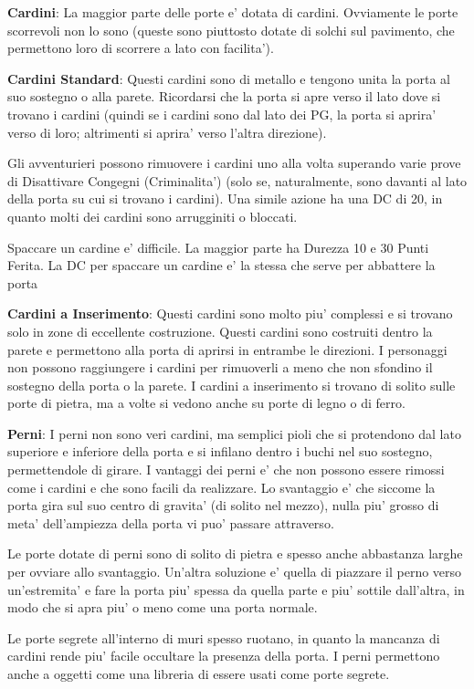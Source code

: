 \documentclass[a4paper,11pt,twoside,openany]{dndbook}
\begin{document}
{\textbf{Cardini}: La maggior parte delle porte e' dotata di cardini. Ovviamente le porte scorrevoli non lo sono (queste sono piuttosto dotate di solchi sul pavimento, che permettono loro di scorrere a lato con facilita').

\textbf{Cardini Standard}: Questi cardini sono di metallo e tengono unita la porta al suo sostegno o alla parete. Ricordarsi che la porta si apre verso il lato dove si trovano i cardini (quindi se i cardini sono dal lato dei PG, la porta si aprira' verso di loro; altrimenti si aprira' verso l’altra direzione). 

Gli avventurieri possono rimuovere i cardini uno alla volta superando varie prove di Disattivare Congegni (Criminalita') (solo se, naturalmente, sono davanti al lato della porta su cui si trovano i cardini). Una simile azione ha una DC di 20, in quanto molti dei cardini sono arrugginiti o bloccati. 

Spaccare un cardine e' difficile. La maggior parte ha Durezza 10 e 30 Punti Ferita. La DC per spaccare un cardine e' la stessa che serve per abbattere la porta

\textbf{Cardini a Inserimento}: Questi cardini sono molto piu' complessi e si trovano solo in zone di eccellente costruzione. Questi cardini sono costruiti dentro la parete e permettono alla porta di aprirsi in entrambe le direzioni. I personaggi non possono raggiungere i cardini per rimuoverli a meno che non sfondino il sostegno della porta o la parete. I cardini a inserimento si trovano di solito sulle porte di pietra, ma a volte si vedono anche su porte di legno o di ferro.

\textbf{Perni}: I perni non sono veri cardini, ma semplici pioli che si protendono dal lato superiore e inferiore della porta e si infilano dentro i buchi nel suo sostegno, permettendole di girare. I vantaggi dei perni e' che non possono essere rimossi come i cardini e che sono facili da realizzare. Lo svantaggio e' che siccome la porta gira sul suo centro di gravita' (di solito nel mezzo), nulla piu' grosso di meta' dell'ampiezza della porta vi puo' passare attraverso.

Le porte dotate di perni sono di solito di pietra e spesso anche abbastanza larghe per ovviare allo svantaggio. Un'altra soluzione e' quella di piazzare il perno verso un'estremita' e fare la porta piu' spessa da quella parte e piu' sottile dall'altra, in modo che si apra piu' o meno come una porta normale.

Le porte segrete all'interno di muri spesso ruotano, in quanto la mancanza di cardini rende piu' facile occultare la presenza della porta. I perni permettono anche a oggetti come una libreria di essere usati come porte segrete.

}
\end{document}
